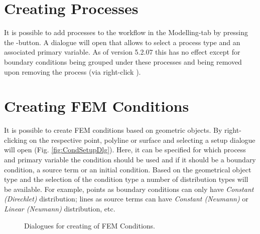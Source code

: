 \section{Creating Processes}

It is possible to add processes to the workflow in the Modelling-tab by pressing the -button. A dialogue will open that allows to select a process type and an associated primary variable. As of version 5.2.07 this has no effect except for boundary conditions being grouped under these processes and being removed upon removing the process (via right-click ).

\section{Creating FEM Conditions}

It is possible to create FEM conditions based on geometric objects. By right-clicking on the respective point, polyline or surface and selecting  a setup dialogue will open (Fig. \ref{fig:CondSetupDlg}). Here, it can be specified for which process and primary variable the condition should be used and if it should be a boundary condition, a source term or an initial condition. Based on the geometrical object type and the selection of the condition type a number of distribution types will be available. For example, points as boundary conditions can only have \emph{Constant (Direchlet)} distribution; lines as source terms can have \emph{Constant (Neumann)} or \emph{Linear (Neumann)} distribution, etc.

\begin{figure}[tb]
\begin{center}
\enspace
{}\enspace
{}
\end{center}
\caption{Dialogues for creating of FEM Conditions.} \label{fig:CondSetup}
\end{figure}

